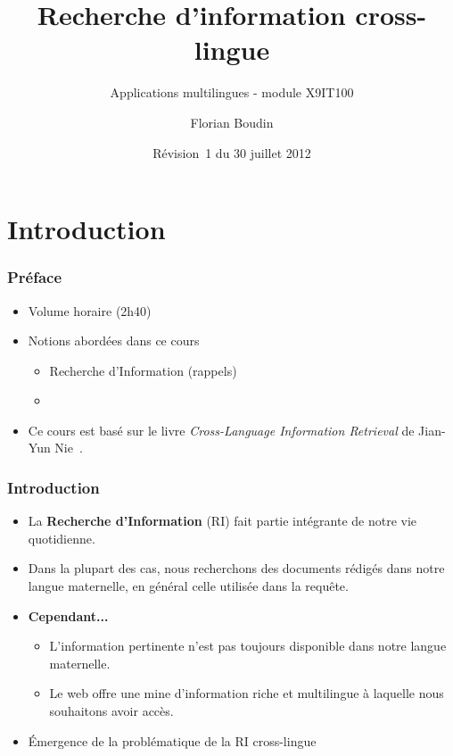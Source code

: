 \documentclass[12pt,aspectratio=43,dvipsnames,table]{beamer}
\title{Recherche d'information cross-lingue}
\subtitle{Applications multilingues - module X9IT100}
\author{Florian Boudin}
\institute{Département informatique, Université de Nantes}
\date[30 juillet 2013 / Rév.~1]{Révision~1 du 30 juillet 2012}
\begin{document}
\frame[plain]{\titlepage}


\section{Introduction}


\begin{frame}
    \frametitle{Préface}
    \begin{itemize} \itemsep10pt
        \item Volume horaire (2h40)
        \item Notions abordées dans ce cours
        \begin{itemize}
            \item Recherche d'Information (rappels)
            \item 
        \end{itemize}
        \item Ce cours est basé sur le livre \textit{Cross-Language Information 
              Retrieval} de Jian-Yun Nie~\cite{DBLP:series/synthesis/2010Nie}.
    \end{itemize}
\end{frame}


\begin{frame}
    \frametitle{Introduction}
    \begin{itemize} \itemsep10pt
        \item La \textbf{Recherche d'Information} (RI) fait partie intégrante de
              notre vie quotidienne.
        \item Dans la plupart des cas, nous recherchons des documents rédigés 
              dans notre langue maternelle, en général celle utilisée dans la 
              requête.
        \item \textbf{Cependant...}
        \begin{itemize}
            \item L'information pertinente n'est pas toujours disponible dans 
                  notre langue maternelle.
            \item Le web offre une mine d'information riche et multilingue à 
                  laquelle nous souhaitons avoir accès.
        \end{itemize}
        \item \'Emergence de la problématique de la RI cross-lingue
    \end{itemize}
\end{frame}
\end{document}
